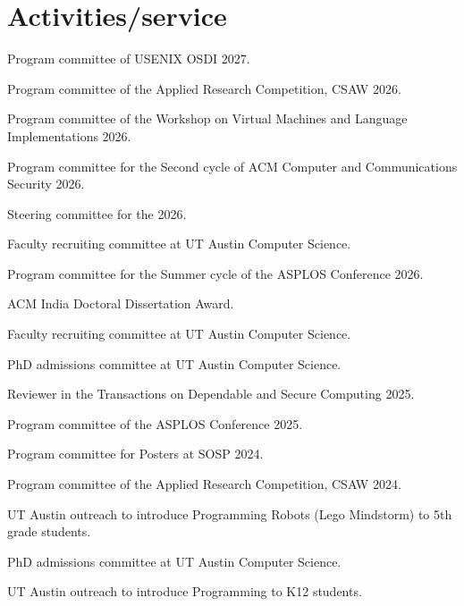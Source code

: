 \section{Activities/service}

{ Program committee of USENIX OSDI 2027. }

{ Program committee of the Applied Research Competition, CSAW 2026. }

{ Program committee of the Workshop on Virtual Machines and Language Implementations 2026. }

{ Program committee for the Second cycle of ACM Computer and Communications Security 2026. }

{ Steering committee for the  2026. }

{ Faculty recruiting committee at UT Austin Computer Science. }

{ Program committee for the Summer cycle of the ASPLOS Conference 2026. }

{ ACM India Doctoral Dissertation Award. }

{ Faculty recruiting committee at UT Austin Computer Science. }

{ PhD admissions committee at UT Austin Computer Science. }

{ Reviewer in the Transactions on Dependable and Secure Computing 2025. }

{ Program committee of the ASPLOS Conference 2025. }

{ Program committee for Posters at SOSP 2024. }

{ Program committee of the Applied Research Competition, CSAW 2024. }

{ UT Austin
outreach to introduce Programming Robots (Lego Mindstorm) to 5th grade students.
}

{ PhD admissions committee at UT Austin Computer Science. }

{ UT Austin
outreach to introduce Programming to K12 students. }

